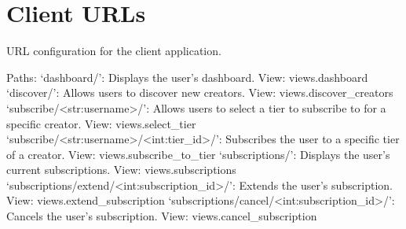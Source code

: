 \documentclass[letterpaper,10pt,english]{sphinxmanual}
\begin{document}
\section{Client URLs}
\label{\detokenize{modules/urls:module-client.urls}}\label{\detokenize{modules/urls:client-urls}}

\begin{fulllineitems}
\label{\detokenize{modules/urls:client.urls.urlpatterns}}
\pysigstartsignatures
{}
\pysigstopsignatures
\sphinxAtStartPar
URL configuration for the client application.

\sphinxAtStartPar
Paths:
\sphinxhyphen{} ‘dashboard/’: Displays the user’s dashboard. View: views.dashboard
\sphinxhyphen{} ‘discover/’: Allows users to discover new creators. View: views.discover\_creators
\sphinxhyphen{} ‘subscribe/\textless{}str:username\textgreater{}/’: Allows users to select a tier to subscribe to for a specific creator. View: views.select\_tier
\sphinxhyphen{} ‘subscribe/\textless{}str:username\textgreater{}/\textless{}int:tier\_id\textgreater{}/’: Subscribes the user to a specific tier of a creator. View: views.subscribe\_to\_tier
\sphinxhyphen{} ‘subscriptions/’: Displays the user’s current subscriptions. View: views.subscriptions
\sphinxhyphen{} ‘subscriptions/extend/\textless{}int:subscription\_id\textgreater{}/’: Extends the user’s subscription. View: views.extend\_subscription
\sphinxhyphen{} ‘subscriptions/cancel/\textless{}int:subscription\_id\textgreater{}/’: Cancels the user’s subscription. View: views.cancel\_subscription


\end{fulllineitems}
\end{document}
